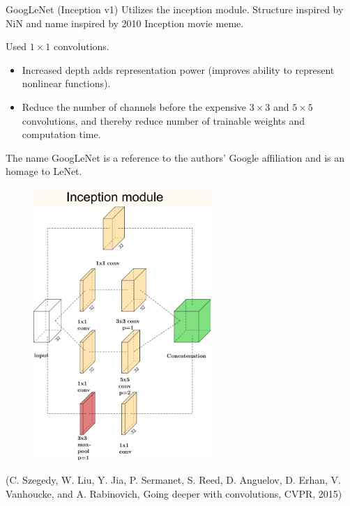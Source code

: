\begin{frame}[allowframebreaks]

\begin{mydefinitionblock}{7.17}{GoogLeNet (Inception v1)}
    Utilizes the inception module. Structure inspired by NiN and name inspired by 2010 Inception movie meme.

    Used $1 \times 1$ convolutions.

    \begin{itemize}
        \item Increased depth adds representation power (improves ability to represent nonlinear functions).
        \item Reduce the number of channels before the expensive $3 \times 3$ and $5 \times 5$ convolutions, and thereby reduce number of trainable weights and computation time.
    \end{itemize}

    The name GoogLeNet is a reference to the authors' Google affiliation and is an homage to LeNet.

    \begin{figure}[H]
        \centering
        \includegraphics[width=0.6\textwidth]{.././assets/7.12.png}
    \end{figure}

    (C. Szegedy, W. Liu, Y. Jia, P. Sermanet, S. Reed, D. Anguelov, D. Erhan, V. Vanhoucke, and A. Rabinovich, Going deeper with convolutions, CVPR, 2015)


\end{mydefinitionblock}
\end{frame}
